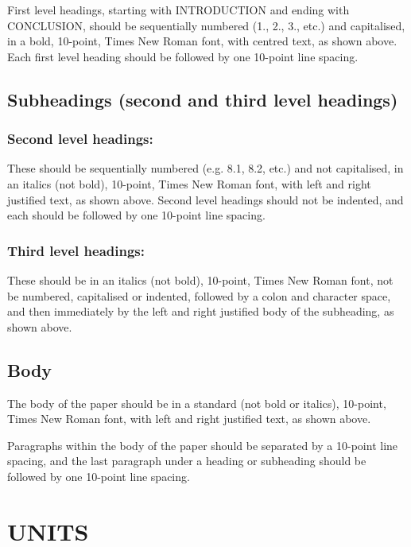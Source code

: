 \documentclass[10pt,twocolumn]{witseiepaper}
\begin{document}
First level headings, starting with INTRODUCTION and ending with CONCLUSION,
should be sequentially numbered (1., 2., 3., etc.) and capitalised, in a bold,
10-point, Times New Roman font, with centred text, as shown above. Each first
level heading should be followed by one 10-point line spacing.

\subsection{Subheadings (second and third level headings)}

\subsubsection*{Second level headings:} These should be sequentially numbered
(e.g. 8.1, 8.2, etc.) and not capitalised, in an italics (not bold), 10-point,
Times New Roman font, with left and right justified text, as shown above.
Second level headings should not be indented, and each should be followed by
one 10-point line spacing.

\subsubsection*{Third level headings:} These should be in an italics (not bold),
10-point, Times New Roman font, not be numbered, capitalised or indented,
followed by a colon and character space, and then immediately by the left and
right justified body of the subheading, as shown above.

\subsection{Body}

The body of the paper should be in a standard (not bold or italics), 10-point,
Times New Roman font, with left and right justified text, as shown above.

Paragraphs within the body of the paper should be separated by a 10-point line
spacing, and the last paragraph under a heading or subheading should be
followed by one 10-point line spacing.


%
\section{UNITS}
\end{document}
